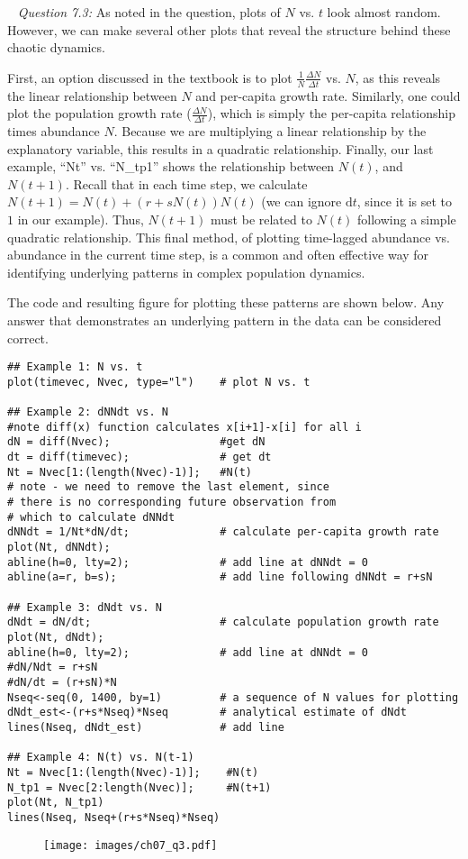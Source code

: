 \documentclass[12pt]{article}
\begin{document}
~\newline
\textit{Question 7.3:}
\newline
As noted in the question, plots of $N$ vs. $t$ look almost random. However, we can make several other plots that reveal the structure behind these chaotic dynamics.

First, an option discussed in the textbook is to plot $\frac{1}{N}\frac{\Delta N}{\Delta t}$ vs. $N$, as this reveals the linear relationship between $N$ and per-capita growth rate. Similarly, one could plot the population growth rate ($\frac{\Delta N}{\Delta t}$), which is simply the per-capita relationship times abundance $N$. Because we are multiplying a linear relationship by the explanatory variable, this results in a quadratic relationship. Finally, our last example, ``Nt'' vs. ``N\_tp1'' shows the relationship between $N(t)$, and $N(t+1)$. Recall that in each time step, we calculate $N(t+1)=N(t)+(r+sN(t))N(t)$ (we can ignore $\mathrm{d}t$, since it is set to $1$ in our example). Thus, $N(t+1)$ must be related to $N(t)$ following a simple quadratic relationship. This final method, of plotting time-lagged abundance vs. abundance in the current time step, is a common and often effective way for identifying underlying patterns in complex population dynamics.

The code and resulting figure for plotting these patterns are shown below. Any answer that demonstrates an underlying pattern in the data can be considered correct.

\begin{verbatim}
## Example 1: N vs. t
plot(timevec, Nvec, type="l")    # plot N vs. t

## Example 2: dNNdt vs. N
#note diff(x) function calculates x[i+1]-x[i] for all i
dN = diff(Nvec);                 #get dN
dt = diff(timevec);              # get dt
Nt = Nvec[1:(length(Nvec)-1)];   #N(t)
# note - we need to remove the last element, since
# there is no corresponding future observation from
# which to calculate dNNdt
dNNdt = 1/Nt*dN/dt;              # calculate per-capita growth rate
plot(Nt, dNNdt);
abline(h=0, lty=2);              # add line at dNNdt = 0
abline(a=r, b=s);                # add line following dNNdt = r+sN

## Example 3: dNdt vs. N
dNdt = dN/dt;                    # calculate population growth rate
plot(Nt, dNdt);
abline(h=0, lty=2);              # add line at dNNdt = 0
#dN/Ndt = r+sN
#dN/dt = (r+sN)*N
Nseq<-seq(0, 1400, by=1)         # a sequence of N values for plotting
dNdt_est<-(r+s*Nseq)*Nseq        # analytical estimate of dNdt
lines(Nseq, dNdt_est)            # add line

## Example 4: N(t) vs. N(t-1)
Nt = Nvec[1:(length(Nvec)-1)];    #N(t)
N_tp1 = Nvec[2:length(Nvec)];     #N(t+1)
plot(Nt, N_tp1)
lines(Nseq, Nseq+(r+s*Nseq)*Nseq)
\end{verbatim}

\begin{figure}[ht]
  \centering
  \texttt{[image: images/ch07\_q3.pdf]}
\end{figure}
\end{document}
